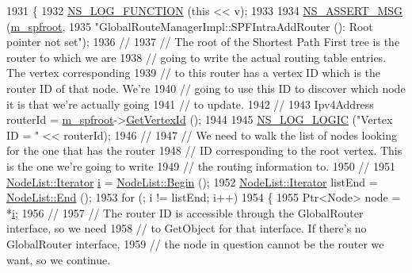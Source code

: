 \begin{DoxyCode}
1931 \{
1932   \hyperlink{log-macros-disabled_8h_a90b90d5bad1f39cb1b64923ea94c0761}{NS\_LOG\_FUNCTION} (\textcolor{keyword}{this} << v);
1933 
1934   \hyperlink{assert_8h_aff5ece9066c74e681e74999856f08539}{NS\_ASSERT\_MSG} (\hyperlink{classns3_1_1GlobalRouteManagerImpl_a977f6b62ef1f1b58d041a2f49c093a1c}{m\_spfroot}, 
1935                  \textcolor{stringliteral}{"GlobalRouteManagerImpl::SPFIntraAddRouter (): Root pointer not set"});
1936 \textcolor{comment}{//}
1937 \textcolor{comment}{// The root of the Shortest Path First tree is the router to which we are }
1938 \textcolor{comment}{// going to write the actual routing table entries.  The vertex corresponding}
1939 \textcolor{comment}{// to this router has a vertex ID which is the router ID of that node.  We're}
1940 \textcolor{comment}{// going to use this ID to discover which node it is that we're actually going}
1941 \textcolor{comment}{// to update.}
1942 \textcolor{comment}{//}
1943   Ipv4Address routerId = \hyperlink{classns3_1_1GlobalRouteManagerImpl_a977f6b62ef1f1b58d041a2f49c093a1c}{m\_spfroot}->\hyperlink{classns3_1_1SPFVertex_addc1067d86f26e9fe3b2e34ed16f929c}{GetVertexId} ();
1944 
1945   \hyperlink{group__logging_ga88acd260151caf2db9c0fc84997f45ce}{NS\_LOG\_LOGIC} (\textcolor{stringliteral}{"Vertex ID = "} << routerId);
1946 \textcolor{comment}{//}
1947 \textcolor{comment}{// We need to walk the list of nodes looking for the one that has the router}
1948 \textcolor{comment}{// ID corresponding to the root vertex.  This is the one we're going to write}
1949 \textcolor{comment}{// the routing information to.}
1950 \textcolor{comment}{//}
1951   \hyperlink{classns3_1_1NodeList_a9e2679a94efb4f0066cc21e65440364d}{NodeList::Iterator} \hyperlink{bernuolliDistribution_8m_a6f6ccfcf58b31cb6412107d9d5281426}{i} = \hyperlink{classns3_1_1NodeList_a93d2211831f5cb71d1dbb721e2721d7f}{NodeList::Begin} (); 
1952   \hyperlink{classns3_1_1NodeList_a9e2679a94efb4f0066cc21e65440364d}{NodeList::Iterator} listEnd = \hyperlink{classns3_1_1NodeList_a027a558c16e6078e25c7ffc67becb559}{NodeList::End} ();
1953   \textcolor{keywordflow}{for} (; i != listEnd; i++)
1954     \{
1955       Ptr<Node> node = *\hyperlink{bernuolliDistribution_8m_a6f6ccfcf58b31cb6412107d9d5281426}{i};
1956 \textcolor{comment}{//}
1957 \textcolor{comment}{// The router ID is accessible through the GlobalRouter interface, so we need}
1958 \textcolor{comment}{// to GetObject for that interface.  If there's no GlobalRouter interface, }
1959 \textcolor{comment}{// the node in question cannot be the router we want, so we continue.}

\end{DoxyCode}
